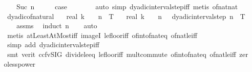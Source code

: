 \begin{isabellebody}
\isamarkupfalse%
\isanewline
\ \ \isamarkupfalse%
\ {\isacharparenleft}{\kern0pt}Suc\ n{\isacharparenright}{\kern0pt}\isanewline
\ \ \isamarkupfalse%
\ \isamarkupfalse%
\ {\isacharquery}{\kern0pt}case\isanewline
\ \ \ \ \ \ \isamarkupfalse%
\ {\isacharparenleft}{\kern0pt}auto\ simp{\isacharcolon}{\kern0pt}\ dyadic{\isacharunderscore}{\kern0pt}interval{\isacharunderscore}{\kern0pt}step{\isacharunderscore}{\kern0pt}iff{\isacharcomma}{\kern0pt}\ metis\ of{\isacharunderscore}{\kern0pt}nat{\isacharunderscore}{\kern0pt}nat{\isacharparenright}{\kern0pt}\isanewline
\ \ \isamarkupfalse%
%
\endisatagproof
{\isafoldproof}%
%
\isadelimproof
\isanewline
%
\endisadelimproof
\isanewline
{}\isamarkupfalse%
\ dyadic{\isacharunderscore}{\kern0pt}of{\isacharunderscore}{\kern0pt}natural{\isacharcolon}{\kern0pt}\isanewline
\ \ \ {\isachardoublequoteopen}real\ k\ {\isacharslash}{\kern0pt}\ {}\ {\isacharcircum}{\kern0pt}\ n\ {\isasymle}\ T{\isachardoublequoteclose}\isanewline
\ \ \ {\isachardoublequoteopen}real\ k\ {\isacharslash}{\kern0pt}\ {}\ {\isacharcircum}{\kern0pt}\ n\ \ {\isasymin}\ dyadic{\isacharunderscore}{\kern0pt}interval{\isacharunderscore}{\kern0pt}step\ n\ {}\ T{\isachardoublequoteclose}\isanewline
%
\isadelimproof
\ \ %
\endisadelimproof
%
\isatagproof
{}\isamarkupfalse%
\ assms\ \isamarkupfalse%
\ {\isacharparenleft}{\kern0pt}induct\ n{\isacharparenright}{\kern0pt}\isanewline
\ \ \isamarkupfalse%
\ auto\isanewline
\ \ \ \isamarkupfalse%
\ {\isacharparenleft}{\kern0pt}metis\ atLeastAtMost{\isacharunderscore}{\kern0pt}iff\ imageI\ le{\isacharunderscore}{\kern0pt}floor{\isacharunderscore}{\kern0pt}iff\ of{\isacharunderscore}{\kern0pt}int{\isacharunderscore}{\kern0pt}of{\isacharunderscore}{\kern0pt}nat{\isacharunderscore}{\kern0pt}eq\ of{\isacharunderscore}{\kern0pt}nat{\isacharunderscore}{\kern0pt}{}{\isacharunderscore}{\kern0pt}le{\isacharunderscore}{\kern0pt}iff{\isacharparenright}{\kern0pt}\isanewline
\ \ \isamarkupfalse%
\ {\isacharparenleft}{\kern0pt}simp\ add{\isacharcolon}{\kern0pt}\ dyadic{\isacharunderscore}{\kern0pt}interval{\isacharunderscore}{\kern0pt}step{\isacharunderscore}{\kern0pt}iff{\isacharparenright}{\kern0pt}\isanewline
\ \ \isamarkupfalse%
\ {\isacharparenleft}{\kern0pt}smt\ {\isacharparenleft}{\kern0pt}verit{\isacharcomma}{\kern0pt}\ ccfv{\isacharunderscore}{\kern0pt}SIG{\isacharparenright}{\kern0pt}\ divide{\isacharunderscore}{\kern0pt}le{\isacharunderscore}{\kern0pt}eq\ le{\isacharunderscore}{\kern0pt}floor{\isacharunderscore}{\kern0pt}iff\ mult{\isachardot}{\kern0pt}commute\ of{\isacharunderscore}{\kern0pt}int{\isacharunderscore}{\kern0pt}of{\isacharunderscore}{\kern0pt}nat{\isacharunderscore}{\kern0pt}eq\ of{\isacharunderscore}{\kern0pt}nat{\isacharunderscore}{\kern0pt}{}{\isacharunderscore}{\kern0pt}le{\isacharunderscore}{\kern0pt}iff\ zero{\isacharunderscore}{\kern0pt}less{\isacharunderscore}{\kern0pt}power{\isacharparenright}{\kern0pt}%

\end{isabellebody}
